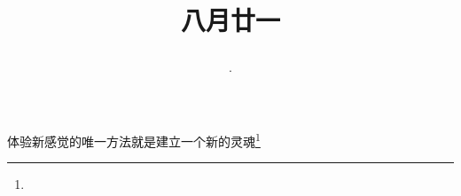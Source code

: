 \title{\date[d=23,m=9,y=2024][year:cn-y,年,month:cn,day:cn,日,·,weekday]·八月廿一 }
体验新感觉的唯一方法就是建立一个新的灵魂\footnote{ }

